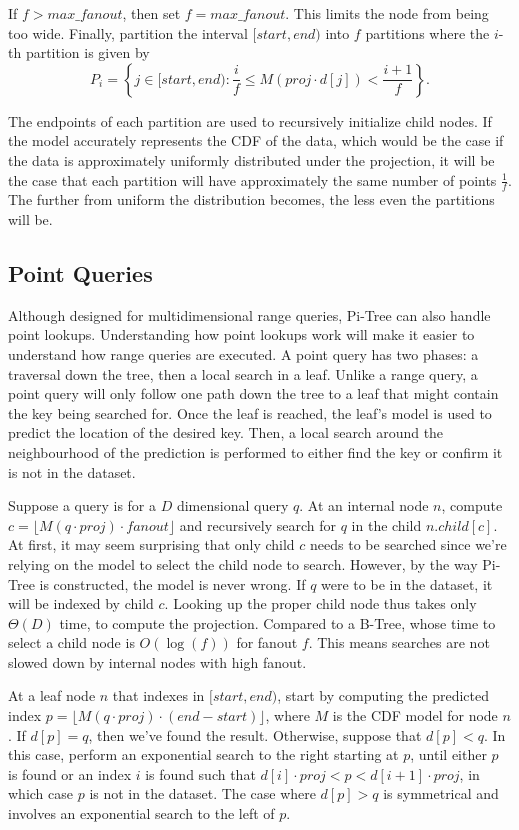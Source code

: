 \documentclass[sigconf,10pt]{acmart}
\begin{document}
If $f > max\_fanout$, then set $f = max\_fanout$. This limits
the node from being too wide. 
Finally, partition the interval $[start, end)$ into $f$ partitions
where the $i$-th partition is given by
\[
  P_i = \left\{j \in [start, end): \frac{i}{f} \leq M(proj \cdot d[j]) < \frac{i+1}{f} \right\}.
\]

The endpoints of each partition are used to recursively initialize child nodes.
If the model accurately represents the CDF of the data, which would be the case
if the data is approximately uniformly distributed under the projection,
it will be the case that each partition will have approximately the same number of
points $\frac{1}{f}$. The further from uniform the distribution becomes,
the less even the partitions will be.


\subsection{Point Queries}

Although designed for multidimensional range queries,
Pi-Tree can also handle point lookups. Understanding how point lookups
work will make it easier to understand how range queries are executed.
A point query has two phases: a traversal down the tree, then a local search
in a leaf.
Unlike a range query, a point query will only follow one path down the tree to
a leaf that might contain the key being searched for. Once the leaf is reached,
the leaf's model is used to predict the location of the desired key. 
Then, a local search around the neighbourhood of the prediction is performed
to either find the key or confirm it is not in the dataset.

Suppose a query is for a $D$ dimensional query $q$.
At an internal node $n$, compute $c = \lfloor M(q \cdot proj) \cdot fanout \rfloor$
and recursively search for $q$ in the child $n.child[c]$.
At first, it may seem surprising that only child $c$ needs to be searched
since we're relying on the model to select the child node to search.
However, by the way Pi-Tree is constructed, the model is never wrong.
If $q$ were to be in the dataset,
it will be indexed by child $c$. Looking up the proper child node thus takes only
$\Theta(D)$ time, to compute the projection. Compared to a B-Tree, whose
time to select a child node is $O(\log(f))$ for fanout $f$. This means
searches are not slowed down by internal nodes with high fanout.

At a leaf node $n$ that indexes in $[start, end)$, start by computing the predicted
index
$p = \lfloor M(q \cdot proj) \cdot (end - start) \rfloor$, where $M$ is the CDF model for node $n$.
If $d[p] = q$, then we've found the result.
Otherwise, suppose that $d[p] < q$.
In this case, perform an exponential search to the right starting at $p$,
until either $p$ is found or an index $i$ is found such that 
$d[i] \cdot proj < p < d[i+1] \cdot proj$, in which case $p$ is not in the dataset.
The case where $d[p] > q$ is symmetrical and involves an exponential search
to the left of $p$.
\end{document}
